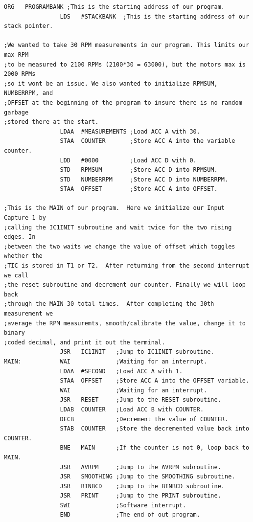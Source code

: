 \documentclass[12pt]{report}
\begin{document}
\begin{Verbatim}[frame=single, fontsize=\footnotesize]
                ORG   PROGRAMBANK ;This is the starting address of our program.
                LDS   #STACKBANK  ;This is the starting address of our stack pointer.

;We wanted to take 30 RPM measurements in our program. This limits our max RPM
;to be measured to 2100 RPMs (2100*30 = 63000), but the motors max is 2000 RPMs
;so it wont be an issue. We also wanted to initialize RPMSUM, NUMBERRPM, and
;OFFSET at the beginning of the program to insure there is no random garbage
;stored there at the start.
                LDAA  #MEASUREMENTS ;Load ACC A with 30.
                STAA  COUNTER       ;Store ACC A into the variable counter.
                LDD   #0000         ;Load ACC D with 0.
                STD   RPMSUM        ;Store ACC D into RPMSUM.
                STD   NUMBERRPM     ;Store ACC D into NUMBERRPM.
                STAA  OFFSET        ;Store ACC A into OFFSET.

;This is the MAIN of our program.  Here we initialize our Input Capture 1 by
;calling the IC1INIT subroutine and wait twice for the two rising edges. In
;between the two waits we change the value of offset which toggles whether the
;TIC is stored in T1 or T2.  After returning from the second interrupt we call
;the reset subroutine and decrement our counter. Finally we will loop back
;through the MAIN 30 total times.  After completing the 30th measurement we
;average the RPM measuremts, smooth/calibrate the value, change it to binary
;coded decimal, and print it out the terminal.
                JSR   IC1INIT   ;Jump to IC1INIT subroutine.
MAIN:           WAI             ;Waiting for an interrupt.
                LDAA  #SECOND   ;Load ACC A with 1.
                STAA  OFFSET    ;Store ACC A into the OFFSET variable.
                WAI             ;Waiting for an interrupt.
                JSR   RESET     ;Jump to the RESET subroutine.
                LDAB  COUNTER   ;Load ACC B with COUNTER.
                DECB            ;Decrement the value of COUNTER.
                STAB  COUNTER   ;Store the decremented value back into COUNTER.
                BNE   MAIN      ;If the counter is not 0, loop back to MAIN.
                JSR   AVRPM     ;Jump to the AVRPM subroutine.
                JSR   SMOOTHING ;Jump to the SMOOTHING subroutine.
                JSR   BINBCD    ;Jump to the BINBCD subroutine.
                JSR   PRINT     ;Jump to the PRINT subroutine.
                SWI             ;Software interrupt.
                END             ;The end of out program.


\end{Verbatim}
\end{document}

